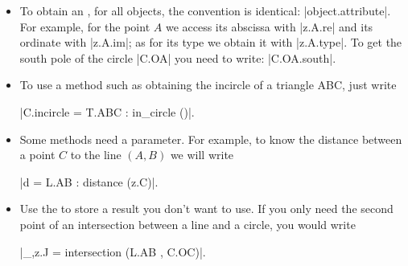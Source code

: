 \begin{itemize}
   \item To obtain an , for all objects, the convention is identical: |object.attribute|. For example, for the point $A$ we access its abscissa with |z.A.re| and its ordinate with |z.A.im|; as for its type we obtain it with |z.A.type|. To get the south pole of the circle |C.OA| you need to write: |C.OA.south|.
   
   \item To use a method such as obtaining the incircle of a triangle ABC, just write  
   
   |C.incircle = T.ABC : in_circle ()|. 
   
   \item Some methods need a parameter. For example, to know the distance between a point  $C$  to the line $(A,B)$ we will write 
   
   |d = L.AB : distance (z.C)|.
   
   \item Use the  to store a result you don't want to use. If you only need the second point of an intersection between a line and a circle, you would write 
   
   |_,z.J = intersection (L.AB , C.OC)|.

\end{itemize}
\endinput